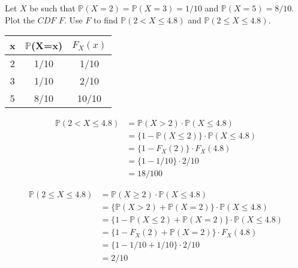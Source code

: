 \item Let $X$ be such that $\mathbb{P}(X=2)=\mathbb{P}(X=3)=1/10$ and $\mathbb{P}(X=5)=8/10$. Plot the $CDF$ $F$.
Use $F$ to find $\mathbb{P}(2<X\le4.8)$ and $\mathbb{P}(2 \le X \le 4.8)$.

\bigskip

\begin{tabular}{c|c c}
  x & $\mathbb{P}$(X=x) & $F_X(x)$ \\
  \hline
  2 & 1/10 & 1/10 \\
  3 & 1/10 & 2/10 \\
  5 & 8/10 & 10/10 \\
\end{tabular}


\begin{align*}
\mathbb{P}(2<X\le4.8) & = \mathbb{P}(X>2) \cdot \mathbb{P}(X\le4.8)
\\&= \big\{1 - \mathbb{P}(X\le2) \big\} \cdot \mathbb{P}(X\le4.8)
\\&= \big\{1 - F_X(2) \big\} \cdot F_X(4.8)
\\&= \big\{1 - 1/10 \big\} \cdot 2/10
\\&= 18/100
\end{align*}

\begin{align*}
\mathbb{P}(2 \le X\le4.8) & = \mathbb{P}(X \ge 2) \cdot \mathbb{P}(X\le4.8)
\\&= \big\{\mathbb{P}(X>2) + \mathbb{P}(X=2)\big\} \cdot \mathbb{P}(X\le4.8)
\\&= \big\{ 1 - \mathbb{P}(X\le2) + \mathbb{P}(X=2) \big\} \cdot \mathbb{P}(X\le4.8)
\\&= \big\{1 - F_X(2) + \mathbb{P}(X=2)\big\} \cdot F_X(4.8)
\\&= \big\{1 - 1/10 + 1/10\big\} \cdot 2/10
\\&= 2/10
\end{align*}
